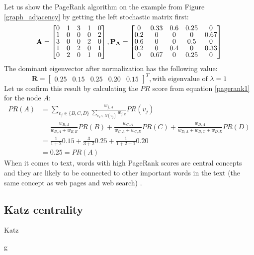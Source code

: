 \documentclass[12pt]{article}
\numberwithin{equation}{section}
\begin{document}
\begin{spacing}{1.5}
	Let us show the PageRank algorithm on the example from Figure \ref{graph_adjacency} by getting the left stochastic matrix first:
	$$
	\mathbf{A} = 
	\renewcommand\arraystretch{0.8} 
	\begin{bmatrix}
			0 & 1 & 3 & 1 & 0 \\
			1 & 0 & 0 & 0 & 2 \\
			3 & 0 & 0 & 2 & 0 \\
			1 & 0 & 2 & 0 & 1 \\
			0 & 2 & 0 & 1 & 0
		\end{bmatrix},
	\mathbf{P}_\mathbf{A} = 
	\renewcommand\arraystretch{0.8} 
	\begin{bmatrix}
		0 & 0.33 & 0.6 & 0.25 & 0 \\
		0.2 & 0 & 0 & 0 & 0.67 \\
		0.6 & 0 & 0 & 0.5 & 0 \\
		0.2 & 0 & 0.4 & 0 & 0.33 \\
		0 & 0.67 & 0 & 0.25 & 0
	\end{bmatrix}
	$$
	The dominant eigenvector after normalization has the following value: 
	$$ \mathbf{R} = \begin{bmatrix}
		0.25 & 0.15 & 0.25 & 0.20 & 0.15
	\end{bmatrix}^T, \text{with eigenvalue of } \lambda = 1 $$
	Let us confirm this result by calculating the $PR$ score from equation \ref{pagerank1} for the node $A$:
	\begin{equation*}
		\begin{split}
			PR(A) & = \sum_{v_j \in \{B, C, D\}} \frac{w_{j, A}}{\sum_{v_k \in N(v_j)} w_{j,k}} PR(v_j) \\
			& = \frac{w_{B,A}}{w_{B,A} + w_{B,E}} PR(B) + \frac{w_{C,A}}{w_{C, A} + w_{C, D}} PR(C) + \frac{w_{D,A}}{w_{D,A} + w_{D, C} + w_{D, E}} PR(D) \\
			& = \frac{1}{1 + 2}0.15 + \frac{3}{3 + 2}0.25 + \frac{1}{1 + 2 + 1}0.20 \\
			& = 0.25 = PR(A)
		\end{split}
	\end{equation*}
	When it comes to text, words with high PageRank scores are central concepts and they are likely to be connected to other important words in the text (the same concept as web pages and web search) \cite{textrank}. 
	\subsection{Katz centrality}
	Katz
	
	g
	

\end{spacing}
\end{document}
